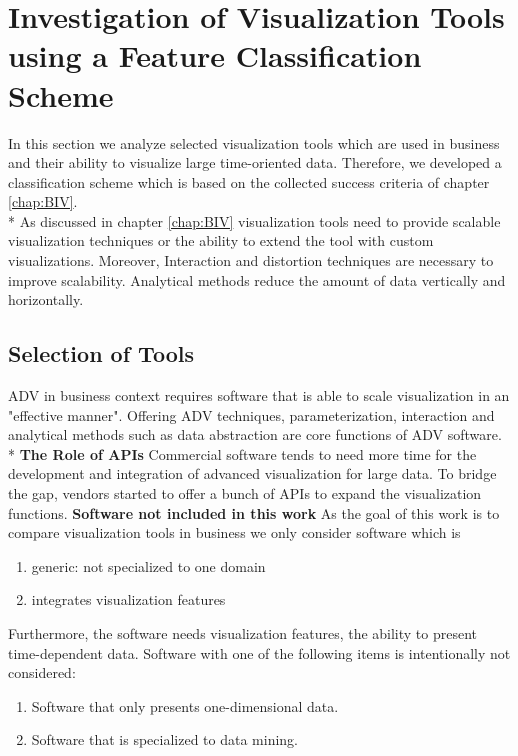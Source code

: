 \chapter{Investigation of Visualization Tools using a Feature Classification Scheme}
\label{chap:Tools}

In this section we analyze selected visualization tools which are used in business and their ability to visualize large time-oriented data. Therefore, we developed a classification scheme which is based on the collected success criteria of chapter \ref{chap:BIV}. \\*
As discussed in chapter \ref{chap:BIV} visualization tools need to provide scalable visualization techniques or the ability to extend the tool with custom visualizations. Moreover, Interaction and distortion techniques are necessary to improve scalability. Analytical methods reduce the amount of data vertically and horizontally. 
\section{Selection of Tools}\label{tool:selection}
ADV in business context requires software that is able to scale visualization in an "effective manner"\cite{Russom2011}. Offering ADV techniques, parameterization, interaction and analytical methods such as data abstraction\cite{Tegarden1999,Aigner2011,Eick2002,Zhanga} are core functions of ADV software. \\*
\textbf{The Role of APIs}
Commercial software tends to need more time for the development and integration of advanced visualization for large data\cite{Zhanga, Simon2014}. To bridge the gap, vendors started to offer a bunch of APIs to expand the visualization functions. 
\textbf{Software not included in this work}
As the goal of this work is to compare visualization tools in business we only consider software which is 
\begin{enumerate}
    \item generic: not specialized to one domain
    \item integrates visualization features
\end{enumerate}

Furthermore, the software needs visualization features, the ability to present time-dependent data. Software with one of the following items is intentionally not considered: 
\begin{enumerate}
    \item Software that only presents one-dimensional data. 
    \item Software that is specialized to data mining.
\end{enumerate}

